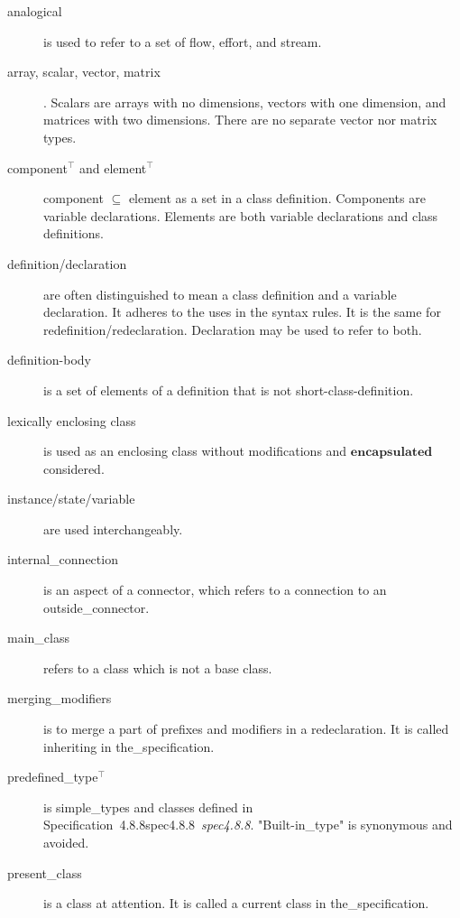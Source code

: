 \documentclass[10pt,b5paper]{article}
\def\specrefx#1#2{Specification~#1\ifx\relax#2\relax{}\else~{\it{}#2}\fi}
\def\specref#1{\specrefx{#1}{\csname spec#1\endcsname}}
\begin{document}
\begin{description}

\item [analogical] is used to refer to a set of flow, effort, and
stream.

\item [array, scalar, vector, matrix].  Scalars are arrays with no
dimensions, vectors with one dimension, and matrices with two
dimensions.  There are no separate vector nor matrix types.

\item [component{$^\top$} {\rm{}and} element{$^\top$}] component
{$\subseteq$} element as a set in a class definition.  Components are
variable declarations.  Elements are both variable declarations and
class definitions.

\item [definition/declaration] are often distinguished to mean a class
definition and a variable declaration.  It adheres to the uses in the
syntax rules.  It is the same for redefinition/redeclaration.
Declaration may be used to refer to both.

\item [definition-body] is a set of elements of a definition that is
not short-class-definition.

\item [lexically enclosing class] is used as an enclosing class
without modifications and $\mathbf{encapsulated}$ considered.

\item [instance/state/variable] are used interchangeably.

\item [internal_connection] is an aspect of a connector, which refers
to a connection to an outside_connector.

\item [main_class] refers to a class which is not a base class.

\item [merging_modifiers] is to merge a part of prefixes and modifiers
in a redeclaration.  It is called inheriting in the_specification.

\item [predefined_type{$\mbox{}^\top$}] is simple_types and classes
defined in \specref{4.8.8}.  "Built-in_type" is synonymous and
avoided.

\item [present_class] is a class at attention.  It is called a current
class in the_specification.


\end{description}
\end{document}
